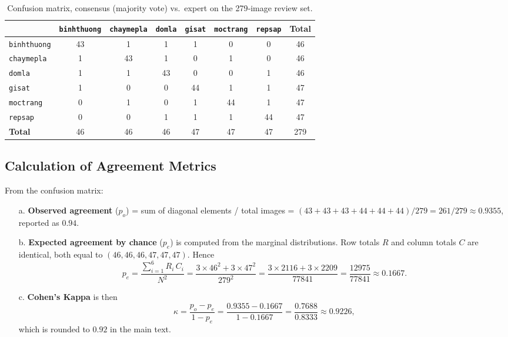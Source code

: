 \begin{table}[htbp]
\centering
\caption{Confusion matrix, consensus (majority vote) vs.\ expert on the 279‑image review set.}
\label{tab:conf_matrix}
\small
\setlength{\tabcolsep}{3pt}
\begin{tabular}{l c c c c c c | c}
\toprule
 & \texttt{binhthuong} & \texttt{chaymepla} & \texttt{domla} & \texttt{gisat} & \texttt{moctrang} & \texttt{repsap} & \textbf{Total} \\
\midrule
\texttt{binhthuong} & 43 & 1 & 1 & 1 & 0 & 0 & 46 \\
\texttt{chaymepla}  &  1 & 43 & 1 & 0 & 1 & 0 & 46 \\
\texttt{domla}      &  1 & 1 & 43 & 0 & 0 & 1 & 46 \\
\texttt{gisat}      &  1 & 0 & 0 & 44 & 1 & 1 & 47 \\
\texttt{moctrang}   &  0 & 1 & 0 & 1 & 44 & 1 & 47 \\
\texttt{repsap}     &  0 & 0 & 1 & 1 & 1 & 44 & 47 \\
\midrule
\textbf{Total}      & 46 & 46 & 46 & 47 & 47 & 47 & 279 \\
\bottomrule
\end{tabular}
\end{table}

\subsection{Calculation of Agreement Metrics}

From the confusion matrix:

\begin{itemize}
    \item[a.] \textbf{Observed agreement} ($p_o$) = sum of diagonal elements / total images = $(43+43+43+44+44+44) / 279 = 261 / 279 \approx 0.9355$, reported as $0.94$.
    \item[b.] \textbf{Expected agreement by chance} ($p_e$) is computed from the marginal distributions. Row totals $R$ and column totals $C$ are identical, both equal to $(46,46,46,47,47,47)$. Hence
    \begin{equation}
        p_e = \frac{\sum_{i=1}^{6} R_i \, C_i}{N^2} = \frac{3 \times 46^2 + 3 \times 47^2}{279^2} = \frac{3 \times 2116 + 3 \times 2209}{77841} = \frac{12975}{77841} \approx 0.1667.
    \end{equation}
    \item[c.] \textbf{Cohen's Kappa} is then
    \begin{equation}
        \kappa = \frac{p_o - p_e}{1 - p_e} = \frac{0.9355 - 0.1667}{1 - 0.1667} = \frac{0.7688}{0.8333} \approx 0.9226,
    \end{equation}
    which is rounded to $0.92$ in the main text.
\end{itemize}

